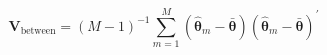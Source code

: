 \begin{equation}
    \label{eq:mi-var-between}
    \mathbf{V}_{\mathrm{between}}
    =
    \left( 
    M - 1 
    \right)^{-1} 
    \sum_{m = 1}^{M} 
    \left( 
    \hat{\boldsymbol{\theta}}_{m}
    - 
    \bar{\boldsymbol{\theta}} 
    \right) 
    \left( 
    \hat{\boldsymbol{\theta}}_{m}
    - 
    \bar{\boldsymbol{\theta}} 
    \right)^{\prime}
\end{equation}
